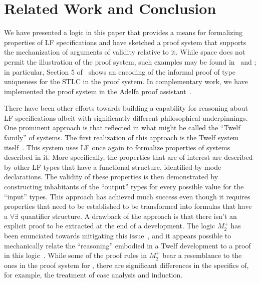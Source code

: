 \section{Related Work and Conclusion}\label{sec:conclusion}

We have presented a logic in this paper that provides
a means for formalizing properties of LF specifications and have
sketched a proof system that supports the mechanization of arguments
of validity relative to it. 
%
While space does not permit the illustration of the proof
system, such examples may be found in~\cite{nadathur21arxiv} and
\cite{southern21phd}; in particular, Section 5
of~\cite{nadathur21arxiv} shows an encoding of the informal proof of
type uniqueness for the STLC in the proof system.
%
In complementary work, we have implemented the proof system in the
Adelfa proof assistant~\cite{southern21phd,southern21lfmtp}. 

There have been other efforts towards building a capability for
reasoning about LF specifications albeit with significantly different
philosophical underpinnings. 
%
One prominent approach is that reflected in what might be called the
``Twelf family'' of systems.
%
The first realization of this approach is the Twelf system
itself~\cite{pfenning99cade}. 
%
This system uses LF once again to formalize properties of systems
described in it.
%
More specifically, the properties that are of interest are described
by other LF types that have a functional structure, identified by mode
declarations. 
%
The validity of these properties is then demonstrated by constructing
inhabitants of the ``output'' types for every possible value for the
``input'' types.
%
This approach has achieved much success even though it requires
properties that need to be established to be transformed into formulas
that have a $\forall\exists$ quantifier structure.
%
A drawback of the approach is that there isn't an
explicit proof to be extracted at the end of a development.
%
The logic $M_2^+$ has been enunciated towards mitigating this
issue~\cite{schurmann00phd}, and it appears possible to mechanically 
relate the ``reasoning'' embodied in a Twelf development to a proof in
this logic~\cite{wang13lfmtp}.
%
While some of the proof rules in $M_2^+$ bear a resemblance to the
ones in the proof system for \logic, there are significant differences
in the specifics of, for example, the treatment of case analysis and
induction.

